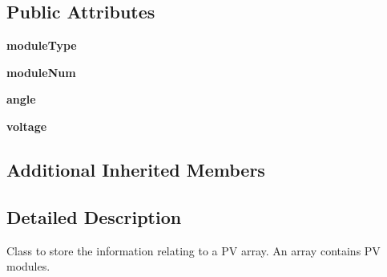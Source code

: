 \subsection*{Public Attributes}
\begin{DoxyCompactItemize}
\item 
\hypertarget{class_solar_calculator_1_1_assets_1_1_p_v_array_aa6894929876ac3ec07ad99d058ba6e00}{{\bfseries module\-Type}}\label{class_solar_calculator_1_1_assets_1_1_p_v_array_aa6894929876ac3ec07ad99d058ba6e00}

\item 
\hypertarget{class_solar_calculator_1_1_assets_1_1_p_v_array_a60683e33374a357a0cd86d5fa95abf73}{{\bfseries module\-Num}}\label{class_solar_calculator_1_1_assets_1_1_p_v_array_a60683e33374a357a0cd86d5fa95abf73}

\item 
\hypertarget{class_solar_calculator_1_1_assets_1_1_p_v_array_a8d82eaf68d39c53f9649aeca950751b7}{{\bfseries angle}}\label{class_solar_calculator_1_1_assets_1_1_p_v_array_a8d82eaf68d39c53f9649aeca950751b7}

\item 
\hypertarget{class_solar_calculator_1_1_assets_1_1_p_v_array_a640b5a6063e914d6b7a91c4a1cf08bad}{{\bfseries voltage}}\label{class_solar_calculator_1_1_assets_1_1_p_v_array_a640b5a6063e914d6b7a91c4a1cf08bad}

\end{DoxyCompactItemize}
\subsection*{Additional Inherited Members}


\subsection{Detailed Description}
\begin{DoxyVerb}Class to store the information relating to a PV array. An array contains PV modules. \end{DoxyVerb}
 

